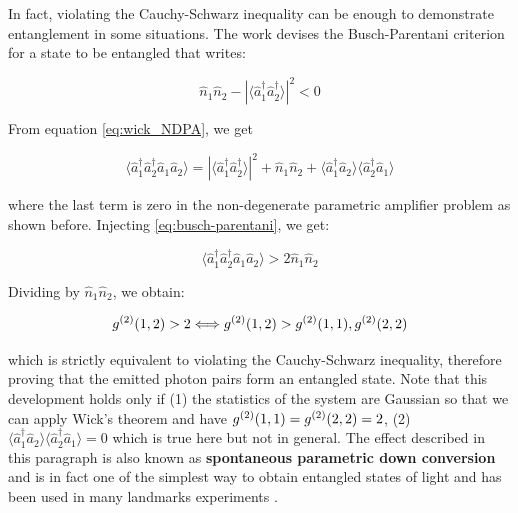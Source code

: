 
In fact, violating the Cauchy-Schwarz inequality can be enough to demonstrate entanglement in some situations. The work \cite{busch2014quantum} devises the Busch-Parentani criterion for a state to be entangled that writes:

\begin{equation}
    \hat{n}_1 \hat{n}_2 - | \langle \hat{a}^{\dagger}_{1} \hat{a}^{\dagger}_{2} \rangle |^2 < 0
    \label{eq:busch-parentani}
\end{equation}

\noindent From equation \ref{eq:wick_NDPA}, we get

\begin{equation}
    \langle \hat{a}^{\dagger}_{1} \hat{a}^{\dagger}_{2} \hat{a}_{1} \hat{a}_{2} \rangle = | \langle \hat{a}^{\dagger}_{1} \hat{a}^{\dagger}_{2} \rangle |^2 + \hat{n}_1 \hat{n}_2 + \langle \hat{a}^{\dagger}_{1} \hat{a}_{2} \rangle \langle \hat{a}^{\dagger}_{2} \hat{a}_{1} \rangle
\end{equation}

\noindent where the last term is zero in the non-degenerate parametric amplifier problem as shown before. Injecting \ref{eq:busch-parentani}, we get:

\begin{equation}
    \langle \hat{a}^{\dagger}_{1} \hat{a}^{\dagger}_{2} \hat{a}_{1} \hat{a}_{2} \rangle > 2 \hat{n}_1 \hat{n}_2
\end{equation}

\noindent Dividing by  $\hat{n}_1 \hat{n}_2$, we obtain:

\begin{equation}
    g^{(2)} (1,2) > 2 \Longleftrightarrow g^{(2)} (1,2) > g^{(2)} (1,1), g^{(2)} (2,2)
\end{equation}

\noindent which is strictly equivalent to violating the Cauchy-Schwarz inequality, therefore proving that the emitted photon pairs form an entangled state. Note that this development holds only if (1) the statistics of the system are Gaussian so that we can apply Wick's theorem and have $g^{(2)} (1,1)=g^{(2)} (2,2)=2$, (2) $\langle \hat{a}^{\dagger}_{1} \hat{a}_{2} \rangle \langle \hat{a}^{\dagger}_{2} \hat{a}_{1} \rangle = 0$ which is true here but not in general. The effect described in this paragraph is also known as \textbf{spontaneous parametric down conversion} and is in fact one of the simplest way to obtain entangled states of light and has been used in many landmarks experiments \cite{burnham1970,heidmann1987observation,rarity1990experimental}.

